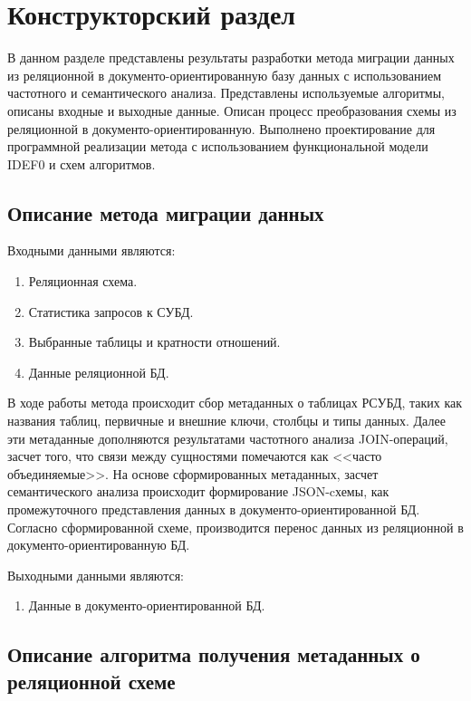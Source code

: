 \chapter{Конструкторский раздел}
В данном разделе представлены результаты разработки метода миграции данных 
из реляционной в документо-ориентированную базу данных 
с использованием частотного и семантического анализа.
Представлены используемые алгоритмы, описаны входные и выходные данные.
Описан процесс преобразования схемы из реляционной в документо-ориентированную.
Выполнено проектирование для программной реализации метода с
использованием функциональной модели IDEF0 и схем алгоритмов.

\section{Описание метода миграции данных}
Входными данными являются:
\begin{enumerate}
    \item Реляционная схема.
    \item Статистика запросов к СУБД.
    \item Выбранные таблицы и кратности отношений.
    \item Данные реляционной БД.
\end{enumerate}

В ходе работы метода происходит сбор метаданных о таблицах РСУБД, 
таких как названия таблиц, первичные и внешние ключи, столбцы и типы данных.
Далее эти метаданные дополняются результатами частотного анализа JOIN-операций, 
засчет того, что связи между сущностями помечаются как <<часто объединяемые>>. 
На основе сформированных метаданных, 
засчет семантического анализа происходит формирование JSON-cхемы, 
как промежуточного представления данных в документо-ориентированной БД.
Согласно сформированной схеме, производится перенос данных из реляционной в документо-ориентированную БД.

Выходными данными являются:
\begin{enumerate}
    \item Данные в документо-ориентированной БД.
\end{enumerate}
\clearpage



\section{Описание алгоритма получения метаданных о реляционной схеме}

